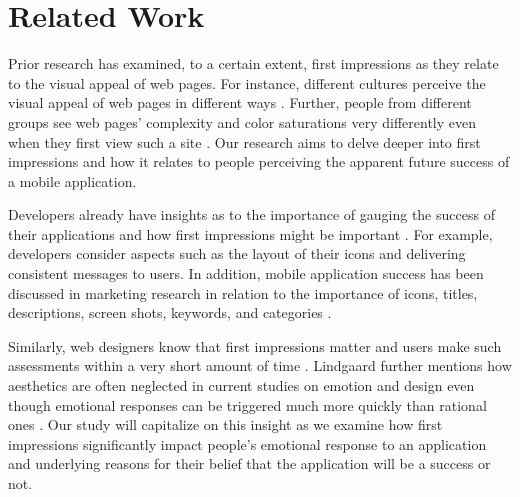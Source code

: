 \section{Related Work}


Prior research has examined, to a certain extent, first impressions as they relate to the visual appeal of web pages. For instance, different cultures perceive the visual appeal of web pages in different ways \cite{Reinecke:2013:PUF:2470654.2481281}. Further, people from different groups see web pages' complexity and color saturations very differently even when they first view such a site \cite{Reinecke:2013:PUF:2470654.2481281}. Our research aims to delve deeper into first impressions and how it relates to people perceiving the apparent future success of a mobile application.

Developers already have insights as to the importance of gauging the success of their applications and how first impressions might be important \cite{wooldridge2010the}. For example, developers consider aspects such as the layout of their icons and delivering consistent messages to users. In addition, mobile application success has been discussed in marketing research in relation to the importance of icons, titles, descriptions, screen shots, keywords, and categories \cite{mureta12:app}.

Similarly, web designers know that first impressions matter and users make such assessments within a very short amount of time \cite{lindgaard}. Lindgaard further mentions how aesthetics are often neglected in current studies on emotion and design even though emotional responses can be triggered much more quickly than rational ones \cite{lindgaard}. Our study will capitalize on this insight as we examine how first impressions significantly impact people's emotional response to an application and underlying reasons for their belief that the application will be a success or not.